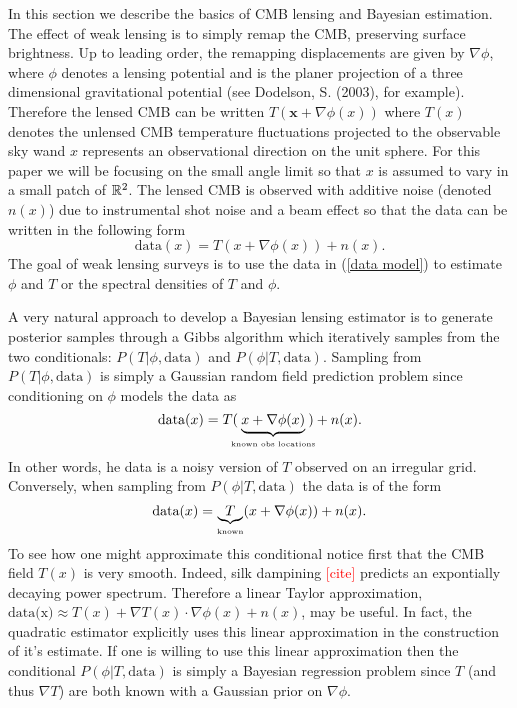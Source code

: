 \documentclass[noinfoline]{imsart}
\newcommand{\bx}{\boldsymbol x}
\begin{document}
In this section we describe the  basics of CMB lensing and Bayesian estimation.  The effect of weak lensing is to simply remap the CMB, preserving surface brightness.   Up to leading order, the remapping  displacements are given by $\nabla \phi$, where $\phi$ denotes a lensing potential and is the planer projection of a three dimensional gravitational potential (see Dodelson, S. (2003), for example). Therefore the lensed CMB can  be written $T(\bx + \nabla \phi(x))$ where $T(x)$ denotes the unlensed CMB temperature fluctuations projected to the observable sky wand $x$ represents an observational direction on the unit sphere. For this paper we will be focusing on the small angle limit  so that $x$ is assumed to vary in a small patch of $ \Bbb R^2$. The lensed CMB is observed with additive noise (denoted $n(x)$) due to instrumental shot noise and a beam effect so  that the data can be written in the following form
\begin{equation}
\label{data model}
 \text{data}(x)= T(x + \nabla \phi(x))+ n(x).
\end{equation}
The goal of weak lensing surveys is to use the data in (\ref{data model}) to  estimate $\phi$ and $T$ or the spectral densities of $T$ and $\phi$.  

A very natural approach to develop a Bayesian lensing estimator is to generate posterior samples through a Gibbs algorithm which iteratively samples from the two conditionals: $P(T |  \phi,\text{data})$ and $P(\phi | T,  \text{data})$.
Sampling from $P(T |  \phi,\text{data})$ is simply a Gaussian random field prediction problem since conditioning on $\phi$ models the data as
\[ \text{data}(x) = T(\!\!\!\underbrace{x+\nabla\phi(x)}_\text{\tiny known obs locations}\!\!\!) + n(x).\]
In other words, he data is a noisy version of  $T$ observed on an irregular grid. 
Conversely, when sampling from $P(\phi | T,\text{data})$ the data is of the form
\[ \text{data}(x) = \underbrace{\!\!T\!\!}_{\text{\tiny known}}(x+\nabla\phi(x)) + n(x). \]
To see how one might approximate this conditional notice first that the CMB field $T(x)$ is very smooth. Indeed, silk dampining \textcolor{red}{[cite]} predicts  an expontially decaying power spectrum. Therefore a linear Taylor approximation,  $\text{data(x)} \approx T(x) + \nabla T(x)\cdot \nabla\phi(x) + n(x)$, may be useful. In fact, the quadratic estimator explicitly uses this linear approximation in the construction of it's estimate. 
If one is willing to use this linear approximation then the conditional $P(\phi | T,\text{data})$ is simply a Bayesian regression problem since $T$ (and thus $\nabla T$) are both known with a Gaussian prior on $\nabla \phi$.
\end{document}
